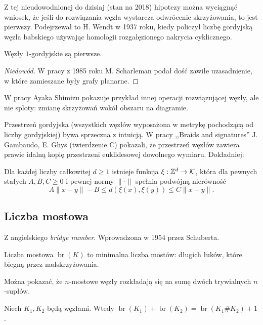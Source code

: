 Z tej nieudowodnionej do dzisiaj (stan na 2018) hipotezy można wyciągnąć wniosek,
że jeśli do rozwiązania węzła wystarcza odwrócenie skrzyżowania, to jest pierwszy.
Podejrzewał to H. Wendt w 1937 roku,
kiedy policzył liczbę gordyjską węzła babskiego używając homologii rozgałęzionego nakrycia cyklicznego.

\begin{proposition}
    Węzły $1$-gordyjskie są pierwsze.
\end{proposition}

\begin{proof}[Niedowód]
    W pracy \cite{scharleman85} z 1985 roku M. Scharleman podał dość zawiłe uzasadnienie, w które zamieszane były grafy planarne.
\end{proof}

W pracy \cite{shimizu14} Ayaka Shimizu pokazuje przykład innej operacji rozwiązującej węzły, ale nie sploty:
zmianę skrzyżowań wokół obszaru na diagramie.

Przestrzeń gordyjska
(wszystkich węzłów wyposażona w metrykę pochodzącą od liczby gordyjskiej)
bywa sprzeczna z intuicją.
W pracy ,,Braids and signatures'' J. Gambaudo, E. Ghys (twierdzenie C) pokazali,
że przestrzeń węzłów zawiera prawie idalną kopię przestrzeni euklidesowej dowolnego wymiaru.
Dokładniej:

\begin{proposition}
    Dla każdej liczby całkowitej $d \ge 1$ istnieje funkcja $\xi: \mathbb Z^d \to \mathcal{K}$, która dla pewnych stałych $A, B, C \ge 0$ i pewnej normy $\|\cdot\|$ spełnia podwójną nierówność
    \[
        A\|x-y\|  - B \le d(\xi(x), \xi(y)) \le C\|x-y\|.
    \]
\end{proposition}


\subsection{Liczba mostowa} %
\label{sub:bridge_index}
Z angielskiego \emph{bridge number}.
Wprowadzona w 1954 przez Schuberta.
\begin{definition}
    Liczba mostowa $\operatorname{br}(K)$ to minimalna liczba mostów:
    długich łuków, które biegną przez nadskrzyżowania.
\end{definition}

Można pokazać, że $n$-mostowe węzły rozkładają się na sumę dwóch trywialnych $n$-supłów.

\begin{proposition}
    Niech $K_1, K_2$ będą węzłami.
    Wtedy $\operatorname{br} (K_1) + \operatorname{br}(K_2) = \operatorname{br}(K_1 \# K_2) + 1$.
\end{proposition}

